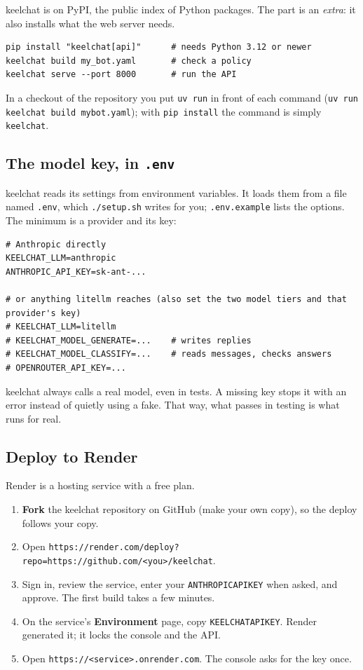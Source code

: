 \documentclass[11pt,a4paper]{article}
\newcommand{\codeus}{\textunderscore\allowbreak}
\newcommand{\code}[1]{{\renewcommand{\_}{\codeus}\texttt{\upshape #1}}}
\begin{document}
keelchat is on PyPI, the public index of Python packages. The \code{[api]} part is an \emph{extra}: it also
installs what the web server needs.

\begin{lstlisting}[style=bashstyle]
pip install "keelchat[api]"      # needs Python 3.12 or newer
keelchat build my_bot.yaml       # check a policy
keelchat serve --port 8000       # run the API
\end{lstlisting}

In a checkout of the repository you put \code{uv run} in front of each command
(\code{uv run keelchat build my\_bot.yaml}); with \code{pip install} the command is simply \code{keelchat}.

\subsection{The model key, in \texttt{.env}}

keelchat reads its settings from environment variables. It loads them from a file named
\code{.env}, which \code{./setup.sh} writes for you; \code{.env.example} lists the options. The minimum is a provider and its key:

\begin{lstlisting}[style=bashstyle]
# Anthropic directly
KEELCHAT_LLM=anthropic
ANTHROPIC_API_KEY=sk-ant-...

# or anything litellm reaches (also set the two model tiers and that provider's key)
# KEELCHAT_LLM=litellm
# KEELCHAT_MODEL_GENERATE=...    # writes replies
# KEELCHAT_MODEL_CLASSIFY=...    # reads messages, checks answers
# OPENROUTER_API_KEY=...
\end{lstlisting}

\begin{warn}
keelchat always calls a real model, even in tests. A missing key stops it with an error instead of quietly
using a fake. That way, what passes in testing is what runs for real.
\end{warn}

\subsection{Deploy to Render}

Render is a hosting service with a free plan.
\begin{enumerate}[leftmargin=1.4em]
  \item \textbf{Fork} the keelchat repository on GitHub (make your own copy), so the deploy follows your copy.
  \item Open \code{https://render.com/deploy?repo=https://github.com/<you>/keelchat}.
  \item Sign in, review the service, enter your \code{ANTHROPIC\_API\_KEY} when asked, and approve. The first build
    takes a few minutes.
  \item On the service's \textbf{Environment} page, copy \code{KEELCHAT\_API\_KEY}. Render generated it; it locks
    the console and the API.
  \item Open \code{https://<service>.onrender.com}. The console asks for the key once.
\end{enumerate}
\end{document}
